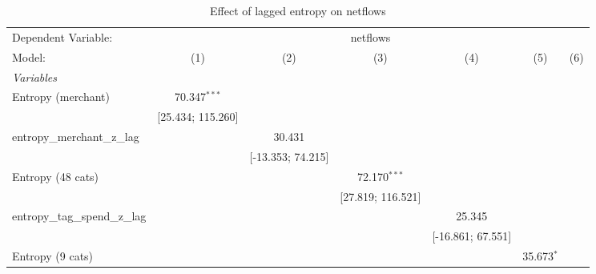 
\begin{table}[htbp]
   \centering
   \tiny
   \begin{threeparttable}[b]
      \caption{\label{tab:reg_netflows_lagged_z} Effect of lagged entropy on netflows}
      \begin{tabular}{lcccccc}
         \tabularnewline \midrule \midrule
         Dependent Variable: & \multicolumn{6}{c}{netflows}\\
         Model:                          & (1)                  & (2)                  & (3)                  & (4)                  & (5)                  & (6)\\  
         \midrule
         \emph{Variables}\\
         Entropy (merchant)              & 70.347$^{***}$       &                      &                      &                      &                      &   \\   
                                         & [25.434; 115.260]    &                      &                      &                      &                      &   \\   
         entropy\_merchant\_z\_lag       &                      & 30.431               &                      &                      &                      &   \\   
                                         &                      & [-13.353; 74.215]    &                      &                      &                      &   \\   
         Entropy (48 cats)               &                      &                      & 72.170$^{***}$       &                      &                      &   \\   
                                         &                      &                      & [27.819; 116.521]    &                      &                      &   \\   
         entropy\_tag\_spend\_z\_lag     &                      &                      &                      & 25.345               &                      &   \\   
                                         &                      &                      &                      & [-16.861; 67.551]    &                      &   \\   
         Entropy (9 cats)                &                      &                      &                      &                      & 35.673$^{*}$         &   \\   

\end{tabular}
\end{threeparttable}
\end{table}
